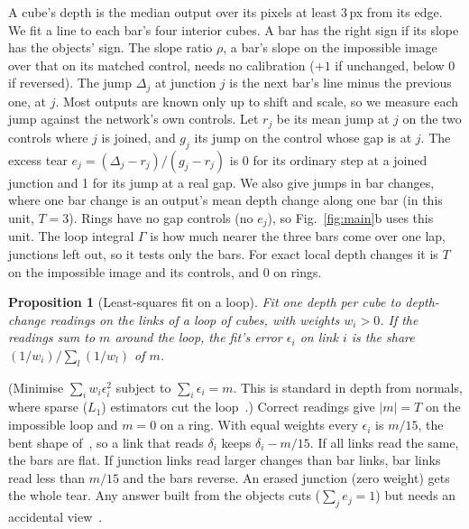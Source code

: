 \documentclass[10pt,twocolumn,letterpaper]{article}
\newtheorem{proposition}{Proposition}
\begin{document}
A cube's depth is the median output over its pixels at least 3\,px from its edge. We fit a line to each bar's four
interior cubes. A bar has the right sign if its slope has the objects' sign. The slope ratio $\rho$, a bar's slope on
the impossible image over that on its matched control, needs no calibration ($+1$ if unchanged, below 0 if reversed).
The jump $\Delta_j$ at junction $j$ is the next bar's line minus the previous one, at $j$. Most outputs are known only
up to shift and scale, so we measure each jump against the network's own controls. Let $r_j$ be its mean jump at $j$
on the two controls where $j$ is joined, and $g_j$ its jump on the control whose gap is at $j$. The excess tear
$e_j=(\Delta_j-r_j)/(g_j-r_j)$ is 0 for its ordinary step at a joined junction and 1 for its jump at a real gap. We
also give jumps in bar changes, where one bar change is an output's mean depth change along one bar (in this unit, $T=3$).
Rings have no gap controls (no $e_j$), so Fig.~\ref{fig:main}b uses this unit. The loop
integral $\Gamma$ is how much nearer the three bars come over one lap, junctions left out, so it tests only the bars.
For exact local depth changes it is $T$ on the impossible image and its controls, and 0 on rings.

\begin{proposition}[Least-squares fit on a loop]\label{sec:theory}
Fit one depth per cube to depth-change readings on the links of a loop of cubes, with weights $w_i>0$. If the readings
sum to $m$ around the loop, the fit's error $\epsilon_i$ on link $i$ is the share $(1/w_i)/\sum_l(1/w_l)$ of $m$.
\end{proposition}
\noindent (Minimise $\sum_iw_i\epsilon_i^2$ subject to $\sum_i\epsilon_i=m$. This is standard in depth from normals, where sparse ($L_1$) estimators cut the
loop~\cite{frankot1988enforcing,agrawal2006range,reddy2009enforcing,queau2018survey}.) Correct readings give $|m|=T$
on the impossible loop and $m=0$ on a ring. With equal weights every $\epsilon_i$ is $m/15$, the bent shape
of~\cite{dodik2025meschers}, so a link that reads $\delta_i$ keeps $\delta_i-m/15$. If all links read the same, the
bars are flat. If junction links read larger changes than bar links, bar links read less than $m/15$ and the bars
reverse. An erased junction (zero weight) gets the whole tear.
Any answer built from the objects cuts ($\sum_je_j=1$) but needs an accidental view~\cite{freeman1994generic}.
\end{document}
